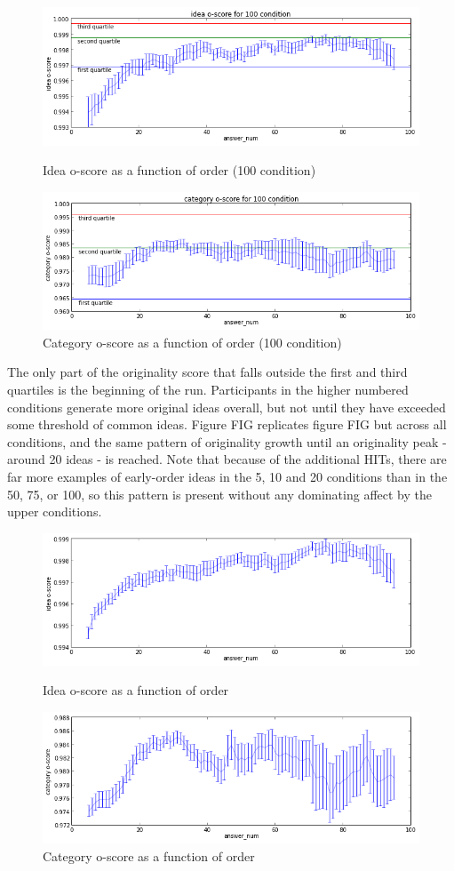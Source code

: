 \begin{figure}[h]
    \centering
    \includegraphics[width=0.9\columnwidth]{idea_oscore_order_100}
    \caption{Idea o-score as a function of order (100 condition)}
    \includegraphics[width=0.9\columnwidth]{cat_oscore_order_100}
    \caption{Category o-score as a function of order (100 condition)}
\end{figure}

The only part of the originality score that falls outside the first and third quartiles is the beginning of the run. Participants in the higher numbered conditions generate more original ideas overall, but not until they have exceeded some threshold of common ideas. Figure FIG replicates figure FIG but across all conditions, and the same pattern of originality growth until an originality peak - around 20 ideas - is reached. Note that because of the additional HITs, there are far more examples of early-order ideas in the 5, 10 and 20 conditions than in the 50, 75, or 100, so this pattern is present without any dominating affect by the upper conditions.

\begin{figure}[h]
    \centering
    \includegraphics[width=0.9\columnwidth]{idea_oscore_order}
    \caption{Idea o-score as a function of order}
    \includegraphics[width=0.9\columnwidth]{cat_oscore_order}
    \caption{Category o-score as a function of order}
\end{figure}

